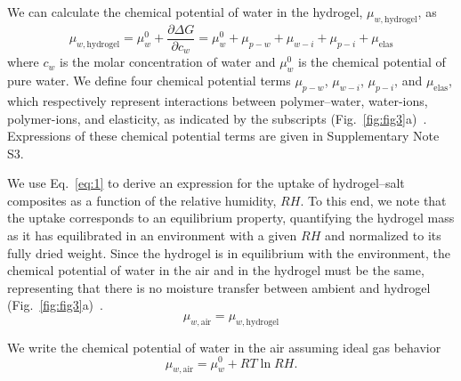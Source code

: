 \documentclass[11pt]{article}
\begin{document}
We can calculate the chemical potential of water in the hydrogel, $\mu_{w,\mathrm{hydrogel}}$, as
\begin{equation}
\mu_{w,\mathrm{hydrogel}} = \mu_w^0 + \frac{\partial \Delta G}{\partial c_w} = \mu_w^0 + \mu_{p-w} + \mu_{w-i} + \mu_{p-i} + \mu_{\mathrm{elas}}
\label{eq:1}
\end{equation}
where $c_w$ is the molar concentration of water and $\mu_w^0$ is the chemical potential of pure water. We define four chemical potential terms $\mu_{p-w}$, $\mu_{w-i}$, $\mu_{p-i}$, and $\mu_{\mathrm{elas}}$, which respectively represent interactions between polymer--water, water-ions, polymer-ions, and elasticity, as indicated by the subscripts (Fig.~\ref{fig:fig3}a)~\cite{chen2022}. Expressions of these chemical potential terms are given in Supplementary Note S3.

We use Eq.~\ref{eq:1} to derive an expression for the uptake of hydrogel--salt composites as a function of the relative humidity, $RH$. To this end, we note that the uptake corresponds to an equilibrium property, quantifying the hydrogel mass as it has equilibrated in an environment with a given $RH$ and normalized to its fully dried weight. Since the hydrogel is in equilibrium with the environment, the chemical potential of water in the air and in the hydrogel must be the same, representing that there is no moisture transfer between ambient and hydrogel (Fig.~\ref{fig:fig3}a)~\cite{dill2010}.
\begin{equation}
\mu_{w,\mathrm{air}} = \mu_{w,\mathrm{hydrogel}}
\label{eq:2}
\end{equation}

We write the chemical potential of water in the air assuming ideal gas behavior~\cite{atkins2006,cengel2019}
\begin{equation}
\mu_{w,\mathrm{air}} = \mu_w^0 + RT \ln RH.
\label{eq:3}
\end{equation}
\end{document}
